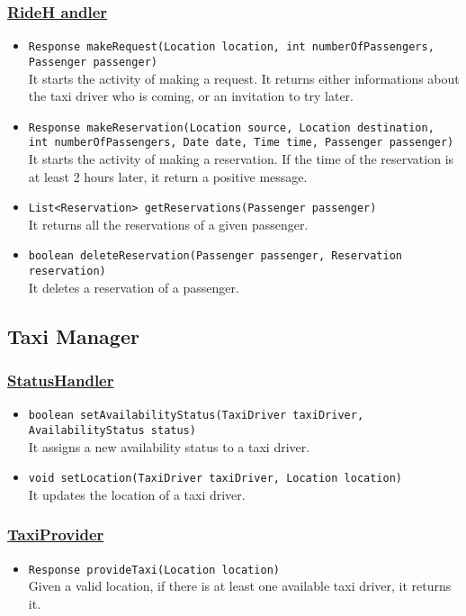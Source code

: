 \subsubsection{\underline{RideH
		andler}}
\begin{itemize}
	\item \texttt{Response makeRequest(Location location, int numberOfPassengers,\\ Passenger passenger)}\\
	It starts the activity of making a request. It returns either informations about the taxi driver who is coming, or an invitation to try later.
	\item \texttt{Response makeReservation(Location source, Location destination, \\ int numberOfPassengers, Date date, Time time, Passenger passenger)}\\
	It starts the activity of making a reservation. If the time of the reservation is at least 2 hours later, it return a positive message.
	\item \texttt{List<Reservation> getReservations(Passenger passenger)}\\
	It returns all the reservations of a given passenger.
	\item \texttt{boolean deleteReservation(Passenger passenger, Reservation reservation)}\\
	It deletes a reservation of a passenger.
\end{itemize}
\subsection{Taxi Manager}
\subsubsection{\underline{StatusHandler}}
\begin{itemize}
	\item \texttt{boolean setAvailabilityStatus(TaxiDriver taxiDriver, AvailabilityStatus status)}\\
	It assigns a new availability status to a taxi driver.
	\item \texttt{void setLocation(TaxiDriver taxiDriver, Location location)}\\
	It updates the location of a taxi driver.
\end{itemize}
\subsubsection{\underline{TaxiProvider}}
\begin{itemize}
	\item \texttt{Response provideTaxi(Location location)}\\
	Given a valid location, if there is at least one available taxi driver, it returns it.
\end{itemize}
